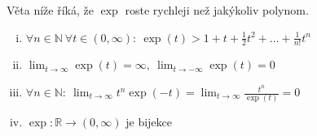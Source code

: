 Věta níže říká, že $\exp$ roste rychleji než jakýkoliv polynom.
\begin{věta}\label{veta:asymptotika exp}\leavevmode
	\begin{enumerate}[(i)]
		\item $\forall n\in \mathbb{N}\ \forall t\in (0,\infty)\colon\ \exp(t)>1+t+\frac{1}{2}t^{2}+\hdots+\frac{1}{n!}t^{n}$
	\item $\displaystyle\lim_{t\to \infty}\exp(t)=\infty,\ \displaystyle\lim_{t\to -\infty}\exp(t)=0$
	\item $\forall n\in \mathbb{N}\colon\ \lim_{t\to \infty}t^{n}\exp(-t)=\lim_{t\to \infty}\frac{t^{n}}{\exp(t)}=0$
	\item $\exp\colon \mathbb{R}\to (0,\infty)$ je bijekce
\end{enumerate}
\end{věta}
